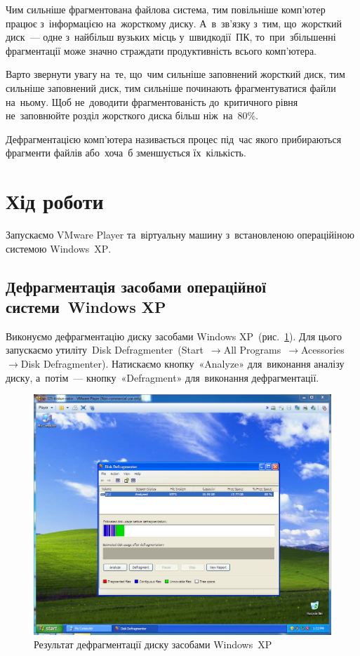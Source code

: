 \documentclass[
	a4paper,
	oneside,
	DIV = 12,
	fontsize = 13pt,
	headings = normal,
]{scrartcl}
\newcommand{\Mytextrightarrow}{$\rightarrow$\hspace{0.25em}}
\begin{document}
		Чим сильніше фрагментована файлова система, тим повільніше комп'ютер працює з~інформацією на~жорсткому диску. А~в~зв'язку з~тим, що~жорсткий диск~— одне з~найбільш вузьких місць у~швидкодії~ПК, то~при~збільшенні фрагментації може значно страждати продуктивність всього комп'ютера.

		Варто звернути увагу на~те, що~чим сильніше заповнений жорсткий диск, тим сильніше заповнений диск, тим сильніше починають фрагментуватися файли на~ньому. Щоб не~доводити фрагментованість до~критичного рівня не~заповнюйте розділ жорсткого диска більш ніж~на~80\%.

		Дефрагментацією комп'ютера називається процес під~час якого прибираються фрагменти файлів або~хоча~б зменшується їх~кількість.

	\section{Хід роботи}
		Запускаємо \textenglish{VMware Player} та~віртуальну машину з~встановленою операційіною системою \textenglish{Windows~XP}.

		\subsection{Дефрагментація засобами операційної системи~\textenglish{Windows XP}}
				Виконуємо дефрагментацію диску засобами \textenglish{Windows XP}~(рис.~\ref{fig:01-winxp-defrag}). Для цього запускаємо утиліту~\textenglish{Disk Defragmenter~(Start~\Mytextrightarrow All Programs~\Mytextrightarrow Acessories~\Mytextrightarrow Disk Defragmenter)}. Натискаємо кнопку~\textenglish{«Analyze»} для~виконання аналізу диску, а~потім~— кнопку~\textenglish{«Defragment»} для~виконання дефрагментації.
			\begin{figure}[!htbp]
				\centering
				\includegraphics[height = 8\baselineskip]{./assets/lab-02-01.png}
				\caption{Результат дефрагментації диску засобами \textenglish{Windows~XP}}
				\label{fig:01-winxp-defrag}
			\end{figure}
\end{document}
